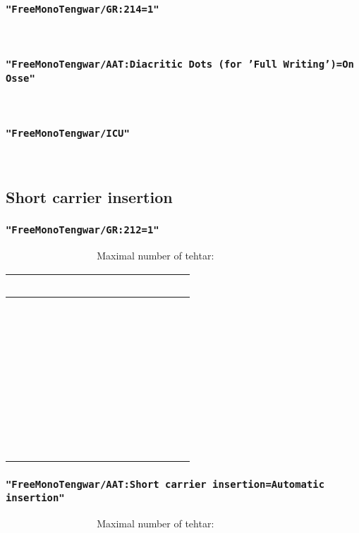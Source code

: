 \documentclass{article}
\begin{document}
\subsubsection*{\texttt{"FreeMonoTengwar/GR:214=1"}}

\osseGR    

\subsubsection*{\texttt{"FreeMonoTengwar/AAT:Diacritic Dots (for 'Full Writing')=On Osse"}}

\osseAAT    

\subsubsection*{\texttt{"FreeMonoTengwar/ICU"}}

\freeICU     


\newpage

\subsection{Short carrier insertion}

\subsubsection*{\texttt{"FreeMonoTengwar/GR:212=1"}}

\insertGR      \normalfont Maximal number of tehtar:
\insertGR  

\newcommand{\combinationsrow}[1]{#1 & #1 & #1 & #1 & #1 & #1 & #1 & #1 & #1 \\}

\begin{tabular}{ c | c c c c c c c c}
	\combinationsrow{} \hline
	\combinationsrow{}
	\combinationsrow{}
	\combinationsrow{}
	\combinationsrow{}
	\combinationsrow{}
	\combinationsrow{}
	\combinationsrow{}
	\combinationsrow{}
\end{tabular}

\subsubsection*{\texttt{"FreeMonoTengwar/AAT:Short carrier insertion=Automatic insertion"}}

\insertAAT      \normalfont Maximal number of tehtar:
\insertAAT  
\end{document}
